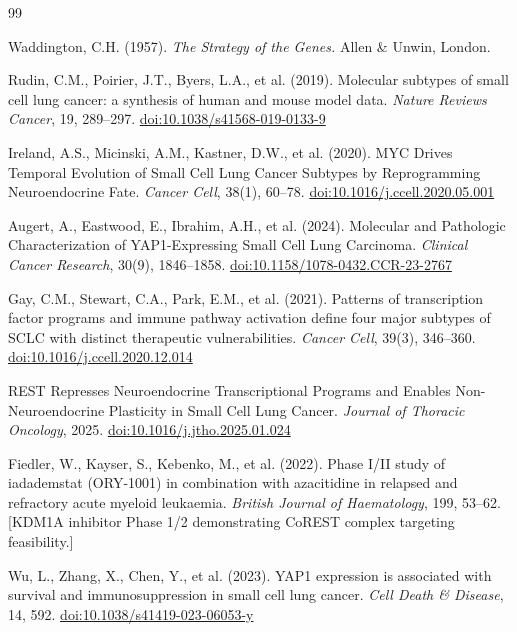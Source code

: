\documentclass[11pt, a4paper]{article}
\begin{document}
\begin{thebibliography}{99}

Waddington, C.H. (1957).
\textit{The Strategy of the Genes.}
Allen \& Unwin, London.

Rudin, C.M., Poirier, J.T., Byers, L.A., et al.
(2019).
Molecular subtypes of small cell lung cancer:
a synthesis of human and mouse model data.
\textit{Nature Reviews Cancer}, 19, 289--297.
\href{https://doi.org/10.1038/s41568-019-0133-9}{%
doi:10.1038/s41568-019-0133-9}

Ireland, A.S., Micinski, A.M., Kastner, D.W., et al.
(2020).
MYC Drives Temporal Evolution of Small Cell
Lung Cancer Subtypes by Reprogramming Neuroendocrine
Fate.
\textit{Cancer Cell}, 38(1), 60--78.
\href{https://doi.org/10.1016/j.ccell.2020.05.001}{%
doi:10.1016/j.ccell.2020.05.001}

Augert, A., Eastwood, E., Ibrahim, A.H., et al.
(2024).
Molecular and Pathologic Characterization of
YAP1-Expressing Small Cell Lung Carcinoma.
\textit{Clinical Cancer Research}, 30(9), 1846--1858.
\href{https://doi.org/10.1158/1078-0432.CCR-23-2767}{%
doi:10.1158/1078-0432.CCR-23-2767}

Gay, C.M., Stewart, C.A., Park, E.M., et al.
(2021).
Patterns of transcription factor programs and
immune pathway activation define four major subtypes
of SCLC with distinct therapeutic vulnerabilities.
\textit{Cancer Cell}, 39(3), 346--360.
\href{https://doi.org/10.1016/j.ccell.2020.12.014}{%
doi:10.1016/j.ccell.2020.12.014}

REST Represses Neuroendocrine Transcriptional
Programs and Enables Non-Neuroendocrine Plasticity
in Small Cell Lung Cancer.
\textit{Journal of Thoracic Oncology}, 2025.
\href{https://doi.org/10.1016/j.jtho.2025.01.024}{%
doi:10.1016/j.jtho.2025.01.024}

Fiedler, W., Kayser, S., Kebenko, M., et al.
(2022).
Phase I/II study of iadademstat (ORY-1001) in
combination with azacitidine in relapsed and
refractory acute myeloid leukaemia.
\textit{British Journal of Haematology}, 199, 53--62.
[KDM1A inhibitor Phase 1/2 demonstrating
CoREST complex targeting feasibility.]

Wu, L., Zhang, X., Chen, Y., et al. (2023).
YAP1 expression is associated with survival and
immunosuppression in small cell lung cancer.
\textit{Cell Death \& Disease}, 14, 592.
\href{https://doi.org/10.1038/s41419-023-06053-y}{%
doi:10.1038/s41419-023-06053-y}


\end{thebibliography}
\end{document}
